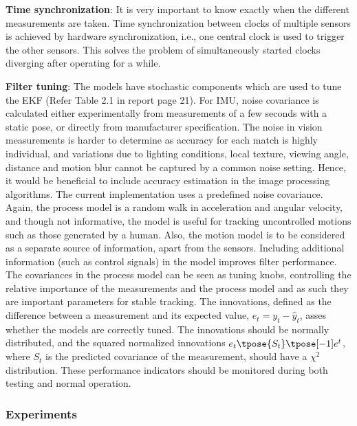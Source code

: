 \textbf{Time synchronization}: It is very important to know exactly when the different measurements are taken. Time synchronization between clocks of multiple sensors is achieved by hardware synchronization, i.e., one central clock is used to trigger the other sensors. This solves the problem of simultaneously started clocks diverging after operating for a while. 

\textbf{Filter tuning}: The models have stochastic components which are used to tune the EKF (Refer Table 2.1 in report page 21). For IMU, noise covariance is calculated either experimentally from measurements of a few seconds with a static pose, or directly from manufacturer specification. The noise in vision measurements is harder to determine as accuracy for each match is highly individual, and variations due to lighting conditions, local texture, viewing angle, distance and motion blur cannot be captured by a common noise setting. Hence, it would be beneficial to include accuracy estimation in the image processing algorithms. 
The current implementation uses a predefined noise covariance. Again, the process model is a random walk in acceleration and angular velocity, and though not informative, the model is useful for tracking uncontrolled motions such as those generated by a human. Also, the motion model is to be considered as a separate source of information, apart from the sensors. Including additional information (such as control signals) in the model improves filter performance. The covariances in the process model can be seen as tuning knobs, controlling the relative importance of the measurements and the process model and as such they are important parameters for stable tracking. The innovations, defined as the difference between a measurement and its expected value, $ e_{t} = y_{t} - \hat{y}_{t} $, asses whether the models are correctly tuned. The innovations should be normally distributed, and the squared normalized innovations $ e_{t}\tpose {S_{t}}\tpose[-1] e^{t} $, where $ S_{t} $ is the predicted covariance of the measurement, should have a $ \chi^{2} $ distribution. These performance indicators should be monitored during both testing and normal operation.

\subsubsection{Experiments}

